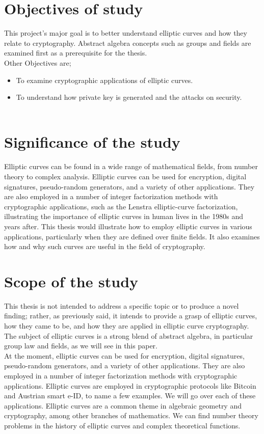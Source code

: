 \section{Objectives of study}
This project's major goal is to better understand elliptic curves and how they relate to cryptography. Abstract algebra concepts such as groups and fields are examined first as a prerequisite for the thesis. \\ Other Objectives are;
\begin{itemize}
	\item To examine cryptographic applications of elliptic curves.
	\item To understand how private key is generated and the attacks on security.\\\\
\end{itemize}

\section{Significance of the study}
Elliptic curves can be found in a wide range of mathematical fields, from number theory to complex analysis. Elliptic curves can be used for encryption, digital signatures, pseudo-random generators, and a variety of other applications. They are also employed in a number of integer factorization methods with cryptographic applications, such as the Lenstra elliptic-curve factorization, illustrating the importance of elliptic curves in human lives in the 1980s and years after. This thesis would illustrate how to employ elliptic curves in various applications, particularly when they are defined over finite fields. It also examines how and why such curves are useful in the field of cryptography.

\section{Scope of the study}
This thesis is not intended to address a specific topic or to produce a novel finding; rather, as previously said, it intends to provide a grasp of elliptic curves, how they came to be, and how they are applied in elliptic curve cryptography. The subject of elliptic curves is a strong blend of abstract algebra, in particular group law and fields, as we will see in this paper.\\
At the moment, elliptic curves can be used for encryption, digital signatures, pseudo-random generators, and a variety of other applications. They are also employed in a number of integer factorization methods with cryptographic applications. Elliptic curves are employed in cryptographic protocols like Bitcoin and Austrian smart e-ID, to name a few examples. We will go over each of these applications. Elliptic curves are a common theme in algebraic geometry and cryptography, among other branches of mathematics. We can find number theory problems in the history of elliptic curves and complex theoretical functions.\\

